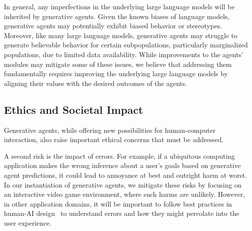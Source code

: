In general, any imperfections in the underlying large language models will be inherited by generative agents. Given the known biases of language models, generative agents may potentially exhibit biased behavior or stereotypes. Moreover, like many large language models, generative agents may struggle to generate believable behavior for certain subpopulations, particularly marginalized populations, due to limited data availability. While improvements to the agents' modules may mitigate some of these issues, we believe that addressing them fundamentally requires improving the underlying large language models by aligning their values with the desired outcomes of the agents.

\subsection{Ethics and Societal Impact}
Generative agents, while offering new possibilities for human-computer interaction, also raise important ethical concerns that must be addressed. 

A second risk is the impact of errors. For example, if a ubiquitous computing application makes the wrong inference about a user's goals based on generative agent predictions, it could lead to annoyance at best and outright harm at worst. In our instantiation of generative agents, we mitigate these risks by focusing on an interactive video game environment, where such harms are unlikely. However, in other application domains, it will be important to follow best practices in human-AI design~\cite{amershi2019guidelines, yang2020re} to understand errors and how they might percolate into the user experience.

